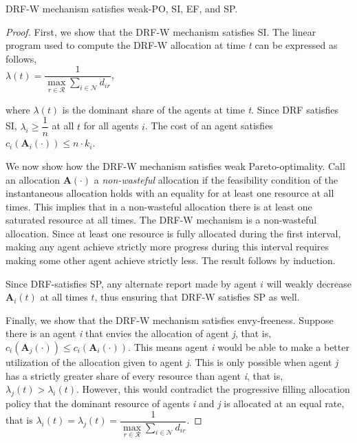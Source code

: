 \documentclass[letterpaper]{article} %
\theoremstyle{definition}
\newenvironment{customthm}[1]
  {\renewcommand\theinnercustomthm{#1}\innercustomthm}
  {\endinnercustomthm}
\begin{document}
\begin{customthm}{1}
DRF-W mechanism satisfies weak-PO, SI, EF, and SP.
\end{customthm}

\begin{proof}
First, we show that the DRF-W mechanism satisfies SI. The linear program used to compute the DRF-W allocation at time \textit{t} can be expressed as follows,
\\$\lambda(t)  = \dfrac{1}{\underset{r \in \mathcal{R}}{\max} \displaystyle \sum_{i \in \mathcal{N}} d_{ir}}$,

\noindent where $\lambda(t)$ is the dominant share of the agents at time \textit{t}.
Since DRF satisfies SI, $\lambda_i \geq \dfrac{1}{n}$ at all $t$ for all agents $i$. The cost of an agent satisfies $c_{i}(\mathbf{A}_{i}(\cdot)) \leq n \cdot k_i$. 

We now show how the DRF-W mechanism satisfies weak Pareto-optimality. 
Call an allocation $\mathbf{A}(\cdot)$ a \textit{non-wasteful} allocation if the feasibility condition of the instantaneous allocation holds with an equality for at least one resource at all times. This implies that in a non-wasteful allocation there is at least one saturated resource at all times. The DRF-W mechanism is a non-wasteful allocation.
Since at least one resource is fully allocated during the first interval, making any agent achieve strictly more progress during this interval requires making some other agent achieve strictly less.  The result follows by induction.


Since DRF-satisfies SP, any alternate report made by agent $i$ will weakly decrease $\mathbf{A}_{i}(t)$ at all times $t$, thus ensuring that DRF-W satisfies SP as well.

Finally, we show that the DRF-W mechanism satisfies envy-freeness. Suppose there is an agent \textit{i} that envies the allocation of agent \textit{j}, that is, $c_{i}(\mathbf{A}_{j}(\cdot)) \leq c_{i}(\mathbf{A}_{i}(\cdot))$. This means agent \textit{i} would be able to make a better utilization of the allocation given to agent \textit{j}. This is only possible when agent \textit{j} has a strictly greater share of every resource than agent \textit{i}, that is, $\lambda_{j}(t) > \lambda_{i}(t)$. However, this would contradict the progressive filling allocation policy that the dominant resource of agents \textit{i} and \textit{j} is allocated at an equal rate, that is $\lambda_{i}(t) = \lambda_{j}(t) = \dfrac{1}{\underset{r \in \mathcal{R}}{\max} \displaystyle \sum_{i \in \mathcal{N}} d_{ir}}$. 

\end{proof}
\end{document}
